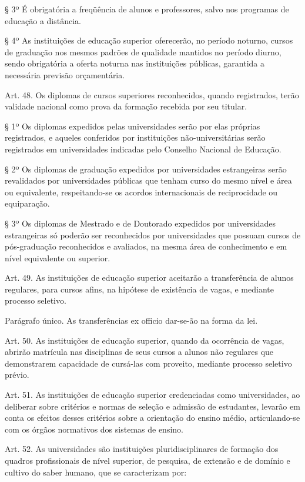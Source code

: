 \documentclass[
]{book}
\begin{document}
§ 3º É obrigatória a freqüência de alunos e professores, salvo nos programas de educação a distância.

§ 4º As instituições de educação superior oferecerão, no período noturno, cursos de graduação nos mesmos padrões de qualidade mantidos no período diurno, sendo obrigatória a oferta noturna nas instituições públicas, garantida a necessária previsão orçamentária.

Art. 48. Os diplomas de cursos superiores reconhecidos, quando registrados, terão validade nacional como prova da formação recebida por seu titular.

§ 1º Os diplomas expedidos pelas universidades serão por elas próprias registrados, e aqueles conferidos por instituições não-universitárias serão registrados em universidades indicadas pelo Conselho Nacional de Educação.

§ 2º Os diplomas de graduação expedidos por universidades estrangeiras serão revalidados por universidades públicas que tenham curso do mesmo nível e área ou equivalente, respeitando-se os acordos internacionais de reciprocidade ou equiparação.

§ 3º Os diplomas de Mestrado e de Doutorado expedidos por universidades estrangeiras só poderão ser reconhecidos por universidades que possuam cursos de pós-graduação reconhecidos e avaliados, na mesma área de conhecimento e em nível equivalente ou superior.

Art. 49. As instituições de educação superior aceitarão a transferência de alunos regulares, para cursos afins, na hipótese de existência de vagas, e mediante processo seletivo.

Parágrafo único. As transferências ex officio dar-se-ão na forma da lei.

Art. 50. As instituições de educação superior, quando da ocorrência de vagas, abrirão matrícula nas disciplinas de seus cursos a alunos não regulares que demonstrarem capacidade de cursá-las com proveito, mediante processo seletivo prévio.

Art. 51. As instituições de educação superior credenciadas como universidades, ao deliberar sobre critérios e normas de seleção e admissão de estudantes, levarão em conta os efeitos desses critérios sobre a orientação do ensino médio, articulando-se com os órgãos normativos dos sistemas de ensino.

Art. 52. As universidades são instituições pluridisciplinares de formação dos quadros profissionais de nível superior, de pesquisa, de extensão e de domínio e cultivo do saber humano, que se caracterizam por:
\end{document}
